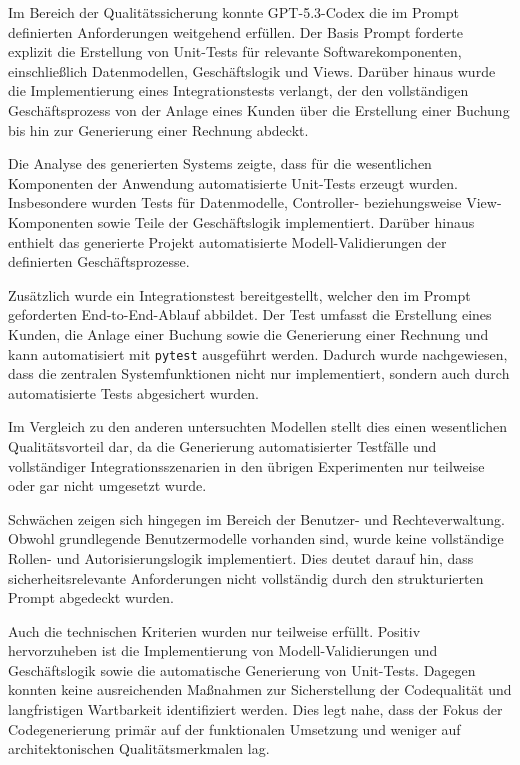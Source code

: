 Im Bereich der Qualitätssicherung konnte GPT-5.3-Codex die im Prompt definierten Anforderungen weitgehend erfüllen. Der Basis Prompt forderte explizit die Erstellung von Unit-Tests für relevante Softwarekomponenten, einschließlich Datenmodellen, Geschäftslogik und Views. Darüber hinaus wurde die Implementierung eines Integrationstests verlangt, der den vollständigen Geschäftsprozess von der Anlage eines Kunden über die Erstellung einer Buchung bis hin zur Generierung einer Rechnung abdeckt.

Die Analyse des generierten Systems zeigte, dass für die wesentlichen Komponenten der Anwendung automatisierte Unit-Tests erzeugt wurden. Insbesondere wurden Tests für Datenmodelle, Controller- beziehungsweise View-Komponenten sowie Teile der Geschäftslogik implementiert. Darüber hinaus enthielt das generierte Projekt automatisierte Modell-Validierungen der definierten Geschäftsprozesse.

Zusätzlich wurde ein Integrationstest bereitgestellt, welcher den im Prompt geforderten End-to-End-Ablauf abbildet. Der Test umfasst die Erstellung eines Kunden, die Anlage einer Buchung sowie die Generierung einer Rechnung und kann automatisiert mit \texttt{pytest} ausgeführt werden. Dadurch wurde nachgewiesen, dass die zentralen Systemfunktionen nicht nur implementiert, sondern auch durch automatisierte Tests abgesichert wurden.

Im Vergleich zu den anderen untersuchten Modellen stellt dies einen wesentlichen Qualitätsvorteil dar, da die Generierung automatisierter Testfälle und vollständiger Integrationsszenarien in den übrigen Experimenten nur teilweise oder gar nicht umgesetzt wurde.

Schwächen zeigen sich hingegen im Bereich der Benutzer- und Rechteverwaltung. Obwohl grundlegende Benutzermodelle vorhanden sind, wurde keine vollständige Rollen- und Autorisierungslogik implementiert. Dies deutet darauf hin, dass sicherheitsrelevante Anforderungen nicht vollständig durch den strukturierten Prompt abgedeckt wurden.

Auch die technischen Kriterien wurden nur teilweise erfüllt. Positiv hervorzuheben ist die Implementierung von Modell-Validierungen und Geschäftslogik sowie die automatische Generierung von Unit-Tests. Dagegen konnten keine ausreichenden Maßnahmen zur Sicherstellung der Codequalität und langfristigen Wartbarkeit identifiziert werden. Dies legt nahe, dass der Fokus der Codegenerierung primär auf der funktionalen Umsetzung und weniger auf architektonischen Qualitätsmerkmalen lag.

